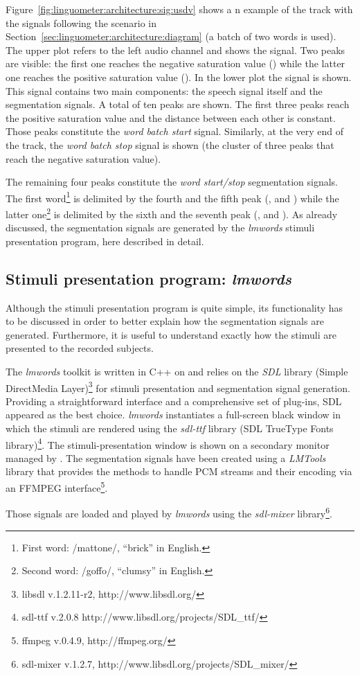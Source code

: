 Figure~\ref{fig:linguometer:architecture:sig:usdv} shows a n
example of the  track with the signals following the
scenario in Section~\ref{sec:linguometer:architecture:diagram} (a batch of two words
is used).
The upper plot refers to the left audio channel and shows the 
signal. Two peaks are visible: the first one reaches the negative saturation
value () while the latter one reaches the positive saturation value 
().
In the lower plot the  signal is shown. This signal contains two
  main components: the speech signal itself and the segmentation signals.
A total of ten peaks are shown.
The first three peaks reach the positive saturation value and the distance
between each other is constant. 
Those peaks constitute the \emph{word batch start} signal.
Similarly, at the very end of the track, the \emph{word batch stop} signal is
shown (the cluster of three peaks that reach the negative saturation value).

The remaining four peaks constitute the \emph{word start/stop} segmentation
signals.
The first word\footnote{First word: /mattone/, ``brick'' in English.}
is delimited by the fourth and the fifth peak
(, and )
while the latter one\footnote{Second word: /goffo/, ``clumsy'' in English.}
is delimited by the sixth and the seventh peak 
(, and ).
As already discussed, the segmentation signals are generated by the
\emph{lmwords} stimuli presentation program, here described in detail.
\subsection{Stimuli presentation program: \emph{lmwords}}
\label{sec:linguometer:technical:lmwords}
Although the stimuli presentation program is quite simple,
its functionality has to be
discussed in order 
to better explain how the segmentation signals are generated. 
Furthermore, it is useful to understand exactly how
the stimuli are presented to the recorded subjects.

The \emph{lmwords} 
toolkit is written in C++ on and relies on the \emph{SDL} library (Simple
DirectMedia Layer)\footnote{libsdl v.1.2.11-r2, http://www.libsdl.org/} 
for stimuli presentation and segmentation signal generation.
Providing a straightforward interface and a comprehensive set of plug-ins, 
SDL appeared as the best choice.
\emph{lmwords} instantiates a full-screen black window in which the stimuli are
rendered using the \emph{sdl-ttf} library (SDL TrueType Fonts
library)\footnote{sdl-ttf v.2.0.8 http://www.libsdl.org/projects/SDL\_ttf/}.
The stimuli-presentation window is shown on a secondary monitor managed by
. The segmentation signals have been created using a
\emph{LMTools} library that provides the methods to handle PCM streams and their
encoding via an FFMPEG interface\footnote{ffmpeg v.0.4.9, http://ffmpeg.org/}.

Those signals are loaded and played by \emph{lmwords} using the \emph{sdl-mixer}
library\footnote{sdl-mixer v.1.2.7,
http://www.libsdl.org/projects/SDL\_mixer/}.

